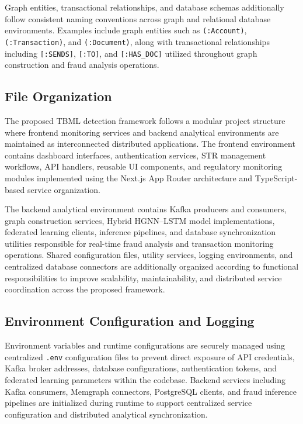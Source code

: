 Graph entities, transactional relationships, and database schemas additionally follow consistent naming conventions across graph and relational database environments. Examples include graph entities such as \texttt{(:Account)}, \texttt{(:Transaction)}, and \texttt{(:Document)}, along with transactional relationships including \texttt{[:SENDS]}, \texttt{[:TO]}, and \texttt{[:HAS\_DOC]} utilized throughout graph construction and fraud analysis operations.

\subsection[File Organization]{\textbf{File Organization}}

The proposed TBML detection framework follows a modular project structure where frontend monitoring services and backend analytical environments are maintained as interconnected distributed applications. The frontend environment contains dashboard interfaces, authentication services, STR management workflows, API handlers, reusable UI components, and regulatory monitoring modules implemented using the Next.js App Router architecture and TypeScript-based service organization.

The backend analytical environment contains Kafka producers and consumers, graph construction services, Hybrid HGNN--LSTM model implementations, federated learning clients, inference pipelines, and database synchronization utilities responsible for real-time fraud analysis and transaction monitoring operations. Shared configuration files, utility services, logging environments, and centralized database connectors are additionally organized according to functional responsibilities to improve scalability, maintainability, and distributed service coordination across the proposed framework.

\subsection[Environment Configuration and Logging]{\textbf{Environment Configuration and Logging}}

Environment variables and runtime configurations are securely managed using centralized \texttt{.env} configuration files to prevent direct exposure of API credentials, Kafka broker addresses, database configurations, authentication tokens, and federated learning parameters within the codebase. Backend services including Kafka consumers, Memgraph connectors, PostgreSQL clients, and fraud inference pipelines are initialized during runtime to support centralized service configuration and distributed analytical synchronization.

